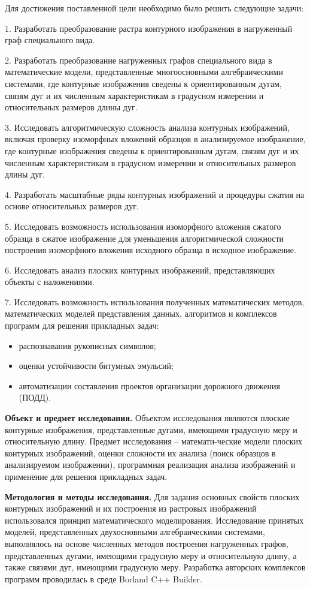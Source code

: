 Для достижения поставленной цели необходимо было решить следующие задачи:	

1. Разработать преобразование растра контурного изображения в нагруженный граф специального вида.

2. Разработать преобразование нагруженных графов специального вида в математические модели, представленные многоосновными алгебраическими системами, где контурные изображения сведены к ориентированным дугам, связям дуг и их численным характеристикам в градусном измерении и  относительных размеров  длины дуг.

3. Исследовать алгоритмическую сложность  анализа контурных изображений, включая проверку изоморфных вложений образцов в анализируемое изображение, где контурные изображения сведены к ориентированным дугам, связям дуг и их численным характеристикам в градусном измерении и  относительных размеров  длины дуг.

4. Разработать  масштабные ряды контурных изображений и процедуры сжатия на  основе относительных размеров дуг.

5. Исследовать возможность использования  изоморфного вложения сжатого образца в сжатое изображение для уменьшения алгоритмической сложности построения  изоморфного вложения исходного образца в исходное изображение.

6. Исследовать анализ плоских контурных изображений, представляющих объекты с наложениями.

7. Исследовать возможность использования полученных математических методов, математических моделей представления данных, алгоритмов и комплексов программ для решения прикладных задач:
\begin{itemize}
   \item распознавания рукописных символов;
   \item  оценки устойчивости битумных эмульсий;
   \item  автоматизации составления проектов организации дорожного движения (ПОДД). 
\end{itemize}


\textbf{Объект и предмет исследования.}  Объектом исследования являются плоские контурные изображения, представленные дугами, имеющими градусную меру и относительную длину. Предмет исследования – математи-ческие модели плоских контурных изображений, оценки сложности их анализа (поиск образцов в анализируемом изображении), программная реализация анализа изображений и применение для решения прикладных задач. 
	
\textbf{Методология и методы исследования.} Для задания основных свойств  плоских контурных изображений и их построения из растровых изображений использовался  принцип математического моделирования. Исследование принятых моделей, представленных двухосновными алгебраическими системами, выполнялось на основе численных методов построения нагруженных графов, представленных дугами, имеющими градусную меру и относительную длину, а также связями дуг, имеющими градусную меру. Разработка авторских комплексов программ проводилась в среде Borland C++ Builder. 


